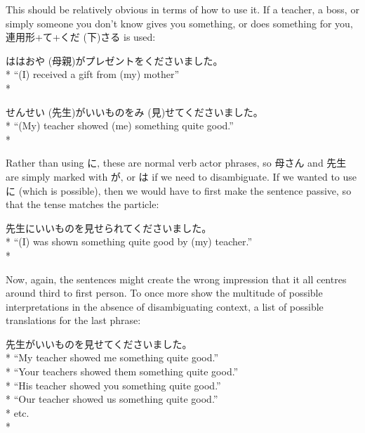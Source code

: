 \documentclass[11pt, b5paper, twoside, openright, onecolumn]{book}
\makeatletter
\newcommand*{\rubystack}[2]{{\relscale{0.5}%
  \begin{tabular}[b]{@{}c@{}}%
    {#1}\\%
   {\textscale{2}{#2}}%
  \end{tabular}}%
}
\DeclareRobustCommand*{\ruby}[2]{%
  \mbox{%
    \setlength{\parskip}{0ex}%
    \BeginAccSupp{method=pdfstringdef,ActualText={#1}}%
      \rubystack{\phantom{#2}}{#1}%
      \llap{%
        \rubystack{#2}{\phantom{#1}}%
      }%
    \EndAccSupp{}%
  }%
}
\renewcommand*{\ruby}[2]{#2 (#1)}%
\newenvironment{exampleblock}{
\setlength{\parindent}{0.6in}
\begin{minipage}[t]{\dimexpr\textwidth-\parindent}}
{\end{minipage}}
\makeatother
\begin{document}
This should be relatively obvious in terms of how to use it. If a teacher‚ a boss‚ or simply someone you don’t know gives you something‚ or does something for you‚ 連用形+て+\ruby{下}{くだ}さる is used:

\vspace{0.4cm}
\begin{exampleblock}
\ruby{母親}{ははおや}がプレゼントをくださいました。 \\* 
“(I) received a gift from (my) mother” \\* 
\end{exampleblock}
\vspace{0.2cm}

\begin{exampleblock}
\ruby{先生}{せんせい}がいいものを\ruby{見}{み}せてくださいました。 \\* 
“(My) teacher showed (me) something quite good.” \\* 
\end{exampleblock}
\vspace{0.2cm}

Rather than using に‚ these are normal verb actor phrases‚ so 母さん and 先生 are simply marked with が‚ or は if we need to disambiguate. If we wanted to use に (which is possible)‚ then we would have to first make the sentence passive‚ so that the tense matches the particle:

\vspace{0.4cm}
\begin{exampleblock}
先生にいいものを見せられてくださいました。 \\* 
“(I) was shown something quite good by (my) teacher.” \\* 
\end{exampleblock}
\vspace{0.2cm}

Now‚ again‚ the sentences might create the wrong impression that it all centres around third to first person. To once more show the multitude of possible interpretations in the absence of disambiguating context‚ a list of possible translations for the last phrase:

\vspace{0.4cm}
\begin{exampleblock}
先生がいいものを見せてくださいました。 \\* 
“My teacher showed me something quite good.” \\* 
“Your teachers showed them something quite good.” \\* 
“His teacher showed you something quite good.” \\* 
“Our teacher showed us something quite good.” \\* 
etc. \\* 
\end{exampleblock}
\vspace{0.2cm}
\end{document}
